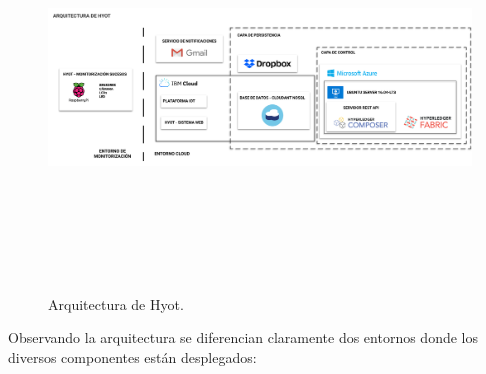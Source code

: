 \documentclass[12pt,a4paper, twoside]{report}
\begin{document}
		\begin{figure}[!ht]   
			\caption{Arquitectura de Hyot.} 
			\begin{center} 
	 			\includegraphics[width=18cm,height=10cm]{Images/implement/hyot_architecture} \\
				\label{fig:hyot_architecture} 
			\end{center}  
		\end{figure}
		
	Observando la arquitectura se diferencian claramente dos entornos donde los diversos componentes están desplegados:
	
\end{document}
